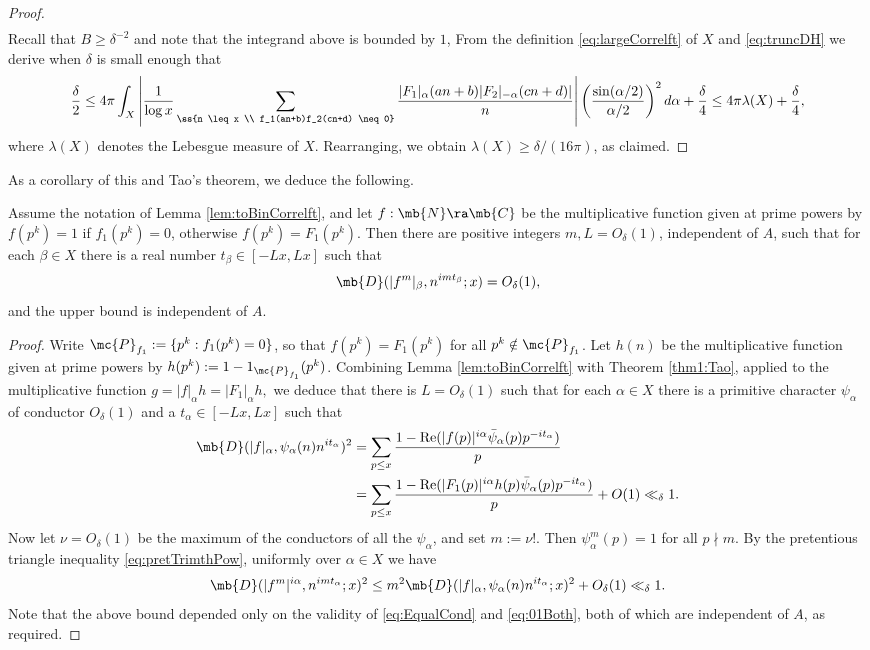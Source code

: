 \begin{proof}
\begin{align}
%
\end{align}
Recall that $B \geq \delta^{-2}$ and note that the integrand above is bounded by $1$, 
From the definition \eqref{eq:largeCorrelft} of $X$ and \eqref{eq:truncDH} we derive when $\delta$ is small enough that
$$
\frac{\delta}{2} \leq 4\pi \int_X \left|\frac{1}{\log x} \sum_{\ss{n \leq x \\ f_1(an+b)f_2(cn+d) \neq 0}} \frac{|F_1|_{\alpha}(an+b) |F_2|_{-\alpha}(cn+d)|}{n}\right| \left(\frac{\sin(\alpha/2)}{\alpha/2}\right)^2 d\alpha + \frac{\delta}{4} \leq 4\pi\lambda(X) + \frac{\delta}{4},
$$
where $\lambda(X)$ denotes the Lebesgue measure of $X$. Rearranging, we obtain $\lambda(X) \geq \delta/(16\pi)$, as claimed. 
\end{proof}
As a corollary of this and Tao's theorem, we deduce the following. 
%
\begin{cor} \label{cor:structuredX}
Assume the notation of Lemma \ref{lem:toBinCorrelft}, and let $f: \mb{N} \ra \mb{C}$ be the multiplicative function given at prime powers by $f(p^k) = 1$ if $f_1(p^k) = 0$, otherwise $f(p^k) = F_1(p^k)$. Then there are positive integers $m, L = O_{\delta}(1)$, independent of $A$,
%
such that for each
%
$\beta \in X$ there is a real number $t_{\beta} \in [-Lx,Lx]$ such that
 $$
 \mb{D}(|f^m|_{\beta}, n^{im t_{\beta}};x) = O_{\delta}(1),
 $$
and the upper bound is independent of $A$.
\end{cor}

\begin{proof}
%
Write $\mc{P}_{f_1} := \{p^k : f_1(p^k) = 0\}$, so that $f(p^k) = F_1(p^k)$ for all $p^k \notin \mc{P}_{f_1}$. Let $h(n)$ be the multiplicative function given at prime powers by $h(p^k) := 1-1_{\mc{P}_{f_1}}(p^k)$. 
%
Combining Lemma \ref{lem:toBinCorrelft} with Theorem \ref{thm1:Tao}, applied to the multiplicative function
$g = |f|_{\alpha}h = |F_1|_{\alpha}h,$
we deduce that there is $L = O_{\delta}(1)$ such that for each $\alpha \in X$ there is a primitive character $\psi_\alpha$ of conductor $O_\delta(1)$ and a $t_\alpha \in [-Lx,Lx]$ such that
\begin{align*}
\mb{D}(|f|_{\alpha}, \psi_{\alpha}(n)n^{it_{\alpha}})^2 &= \sum_{p \leq x} \frac{1-\text{Re}(|f(p)|^{i\alpha} \bar{\psi}_{\alpha}(p)p^{-it_\alpha})}{p} \\
&= \sum_{p \leq x} \frac{1-\text{Re}(|F_1(p)|^{i\alpha} h(p) \bar{\psi}_{\alpha}(p)p^{-it_\alpha})}{p} + O(1) \ll_{\delta} 1.
\end{align*}
Now let $\nu = O_{\delta}(1)$ be the maximum of the conductors of all the $\psi_{\alpha}$, and set $m := \nu!$.
%
Then $\psi_{\alpha}^m(p) = 1$ for all $p\nmid m$. By the pretentious triangle inequality \eqref{eq:pretTrimthPow}, uniformly over $\alpha \in X$ we have
$$
\mb{D}(|f^m|^{i\alpha}, n^{imt_\alpha};x)^2 
%
\leq m^2 \mb{D}(|f|_{\alpha}, \psi_{\alpha}(n)n^{it_{\alpha}};x)^2
%
+ O_{\delta}(1) \ll_{\delta} 1.
$$
%
Note that the above bound depended only on the validity of \eqref{eq:EqualCond} and \eqref{eq:01Both}, both of which are independent of $A$, as required.
%
%
\end{proof}

